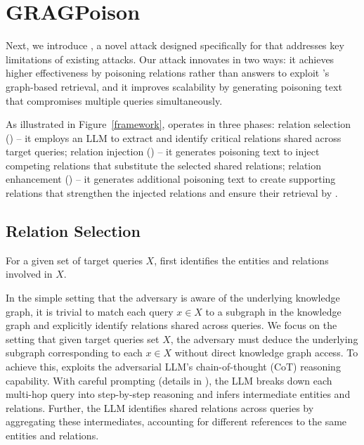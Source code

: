 
\section{GRAGPoison}
\label{sec:GRAGPoison}

Next, we introduce \attack, a novel attack designed specifically for \rag that addresses key limitations of existing attacks. Our attack innovates in two ways: it achieves higher effectiveness by poisoning relations rather than answers to exploit \rag's graph-based retrieval, and it improves scalability by generating poisoning text that compromises multiple queries simultaneously.

As illustrated in Figure~\ref{framework}, \attack operates in three phases:  relation selection () -- it employs an LLM to extract and identify critical relations shared across target queries;  relation injection () -- it generates poisoning text to inject competing relations that substitute the selected shared relations;  relation enhancement () -- it generates additional poisoning text to create supporting relations that strengthen the injected relations and ensure their retrieval by \rag.




\subsection{Relation Selection}
\label{Related Query Recognition}
For a given set of target queries $X$, \attack first identifies the entities and relations involved in $X$.

In the simple setting that the adversary is aware of the underlying knowledge graph, it is trivial to match each query $x \in X$ to a subgraph in the knowledge graph and explicitly identify relations shared across queries. We focus on the setting that given target queries set $X$, the adversary must deduce the underlying subgraph corresponding to each $x \in X$ without direct knowledge graph access. To achieve this, \attack exploits the adversarial LLM's chain-of-thought (CoT) reasoning capability. With careful prompting (details in ), the LLM breaks down each multi-hop query into step-by-step reasoning and infers intermediate entities and relations. Further, the LLM identifies shared relations across queries by aggregating these intermediates, accounting for different references to the same entities and relations.

